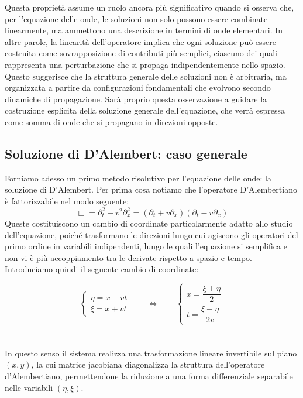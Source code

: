 \documentclass[a4paper,12pt]{report}
\begin{document}
Questa proprietà assume un ruolo ancora più significativo quando si osserva che, per l’equazione delle onde, le soluzioni non solo possono essere combinate linearmente, ma ammettono una descrizione in termini di onde elementari. In altre parole, la linearità dell’operatore implica che ogni soluzione può essere costruita come sovrapposizione di contributi più semplici, ciascuno dei quali rappresenta una perturbazione che si propaga indipendentemente nello spazio. Questo suggerisce che la struttura generale delle soluzioni non è arbitraria, ma organizzata a partire da configurazioni fondamentali che evolvono secondo dinamiche di propagazione. Sarà proprio questa osservazione a guidare la costruzione esplicita della soluzione generale dell’equazione, che verrà espressa come somma di onde che si propagano in direzioni opposte.

\subsection{Soluzione di D'Alembert: caso generale}\label{sec: 4.2.1}

Forniamo adesso un primo metodo risolutivo per l'equazione delle onde: la soluzione di D'Alembert. Per prima cosa notiamo che l'operatore D'Alembertiano è fattorizzabile nel modo seguente:
\[\Box =\partial_t^2-v^2\partial_x^2=(\partial_t+v\partial_x)(\partial_t-v\partial_x)\]
Queste costituiscono un cambio di coordinate particolarmente adatto allo studio dell’equazione, poiché trasformano le direzioni lungo cui agiscono gli operatori del primo ordine in variabili indipendenti, lungo le quali l’equazione si semplifica e non vi è più accoppiamento tra le derivate rispetto a spazio e tempo.
Introduciamo quindi il seguente cambio di coordinate:

\[
\begin{cases}
\eta = x - vt \\
\xi = x + vt
\end{cases}
\qquad \iff \qquad
\begin{cases}
x = \dfrac{\xi + \eta}{2} \\
t = \dfrac{\xi - \eta}{2v}
\end{cases}
\]
\\
\\In questo senso il sistema realizza una trasformazione lineare invertibile sul piano $(x,y)$, la cui matrice jacobiana diagonalizza la struttura dell’operatore d’Alembertiano, permettendone la riduzione a una forma differenziale separabile nelle variabili $(\eta,\xi)$.
\end{document}
